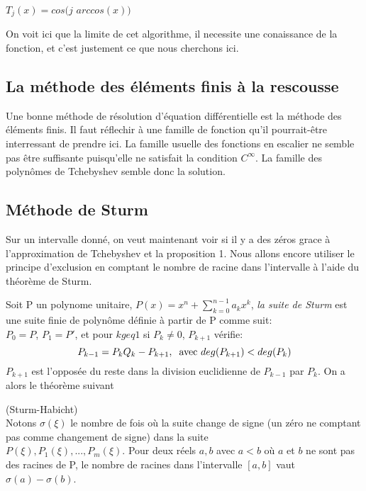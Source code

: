 \documentclass[a4paper,11pt]{article}
\begin{document}
\noindent $T_{j}(x)=cos(j$  $arccos(x))$

\noindent On voit ici que la limite de cet algorithme, il necessite une conaissance de la fonction, et c'est justement ce que nous cherchons ici.

\subsection{La méthode des éléments finis à la rescousse}

Une bonne méthode de résolution d'équation différentielle est la méthode des éléments finis. Il faut réflechir à une famille de fonction qu'il pourrait-être interressant de prendre ici. La famille usuelle des fonctions en escalier ne semble pas être suffisante puisqu'elle ne satisfait la condition $C^{\infty}$.
La famille des polynômes de Tchebyshev semble donc la solution.

\subsection{Méthode de Sturm}

Sur un intervalle donné, on veut maintenant voir si il y a des zéros grace à l'approximation de Tchebyshev et la proposition 1. Nous allons encore utiliser le principe d'exclusion en comptant le nombre de racine dans l'intervalle à l'aide du théorème de Sturm. 


Soit P un polynome unitaire, $P(x)=x^{n} + \sum^{n-1}_{k=0}a_{k}x^{k}$, \textit {la suite de Sturm} est une suite finie de polynôme définie à partir de P comme suit:\\
$P_{0}=P$, $P_{1}=P'$, et pour $k geq 1$ si $P_{k} \neq 0$,  $P_{k+1}$ vérifie:\\
\[P_{k-1}=P_{k}Q_{k}-P_{k+1},\hspace{2mm}\text{avec }    deg(P_{k+1})<deg(P_{k})\] 
$P_{k+1}$ est l'opposée du reste dans la division euclidienne de $P_{k-1}$ par $P_{k}$. On a alors le théorème suivant  
\begin{theorem}(Sturm-Habicht)\\
	 Notons $\sigma(\xi)$ le nombre de fois où la suite change de signe (un zéro ne comptant pas comme changement de signe) dans la suite\\
	 $P(\xi),P_{1}(\xi),...,P_{m}(\xi)$.
	 Pour deux réels $a,b$ avec $a<b$ où $a$ et $b$ ne sont pas des racines de P, le nombre de racines dans l'intervalle $[a,b]$ vaut
	 $\sigma(a)-\sigma(b)$.
\end{theorem}
\end{document}
